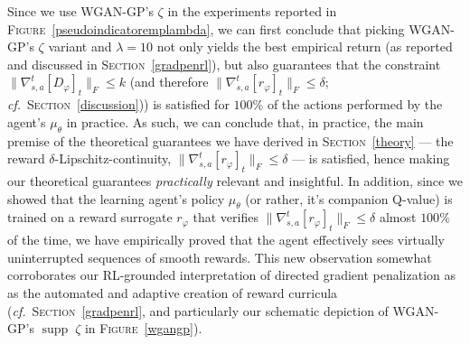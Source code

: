 Since we use WGAN-GP's $\zeta$ in the experiments reported in \textsc{Figure}~\ref{pseudoindicatoremplambda},
we can first conclude that picking WGAN-GP's $\zeta$ variant and $\lambda=10$ not only yields the best
empirical return (as reported and discussed in \textsc{Section}~\ref{gradpenrl}),
but also guarantees that the constraint $\lVert \nabla_{s,a}^t[D_\varphi]_t \rVert _F \leq k$
(and therefore $\lVert \nabla_{s,a}^t[r_\varphi]_t \rVert _F \leq \delta$;
\textit{cf.}~\textsc{Section}~\ref{discussion}))
is satisfied for $100\%$ of the actions performed by the agent's $\mu_\theta$ in practice.
As such, we can conclude that, in practice, the main premise of the theoretical
guarantees we have derived in \textsc{Section}~\ref{theory}
--- the reward $\delta$-Lipschitz-continuity,
$\lVert \nabla_{s,a}^t[r_\varphi]_t \rVert _F \leq \delta$ ---
is satisfied, hence making our theoretical guarantees \emph{practically} relevant and insightful.
In addition, since we showed that the learning agent's policy $\mu_\theta$ (or rather, it's companion Q-value)
is trained on a reward surrogate $r_\varphi$ that verifies
$\lVert \nabla_{s,a}^t[r_\varphi]_t \rVert _F \leq \delta$ almost $100\%$ of the time,
we have empirically proved that the agent effectively sees
virtually uninterrupted sequences of smooth rewards.
This new observation somewhat corroborates our RL-grounded interpretation of directed gradient penalization as
as the automated and adaptive creation of reward curricula (\textit{cf.}~\textsc{Section}~\ref{gradpenrl},
and particularly our schematic depiction of WGAN-GP's $\operatorname{supp} \; \zeta$ in \textsc{Figure}~\ref{wgangp}).

